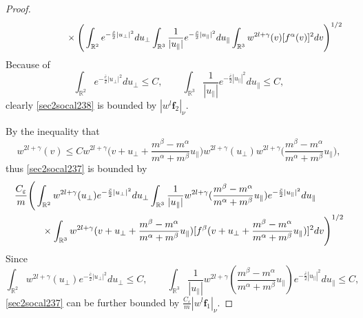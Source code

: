 \documentclass[reqno]{amsart}
\numberwithin{equation}{section}
\numberwithin{equation}{section}
\begin{document}
\begin{proof}
\begin{align}
			&\hspace{2.3cm}\times  \Bigg(\int_{\mathbb{R}^2}  
			e^{-\frac{\bar{c}}{2}|u_{\perp}|^2 } du_{\perp}
			\int_{\mathbb{R}^3}\frac{1}{|u_{\parallel}|}e^{-\frac{\bar{c}}{2}|u_{\parallel}|^2} du_{\parallel}\int_{\mathbb{R}^3}w^{2l+\gamma}(v)[f^\alpha(v)]^2dv\Bigg)^{1/2}\label{sec2socal238}
		\end{align}
		Because of
		\begin{equation*}
			\int_{\mathbb{R}^2}  
			e^{-\frac{\bar{c}}{2}|u_{\perp}|^2 } du_{\perp} \leq C, \qquad  \int_{\mathbb{R}^3}\frac{1}{|u_{\parallel}|}e^{-\frac{\bar{c}}{2}|u_{\parallel}|^2} du_{\parallel} \leq C,
		\end{equation*}
		clearly \eqref{sec2socal238} is  bounded by $|w^{l} \mathbf{f}_2|_\nu$. 
		
		By the inequality that
		\begin{equation*}
			w^{2l+\gamma}(v)\leq C w^{2l+\gamma}\big(v + u_{\perp}+\frac{m^{\beta}-m^{\alpha}}{m^{\alpha}+m^{\beta}}u_{\parallel}\big) w^{2l+\gamma}(u_{\perp}) w^{2l+\gamma}\big(\frac{m^{\beta}-m^{\alpha}}{m^{\alpha}+m^{\beta}}u_{\parallel}\big), 
		\end{equation*}
		thus \eqref{sec2socal237} is  bounded by
		\begin{align}
			&\frac{C_{\varepsilon}}{m} \Bigg(\int_{\mathbb{R}^2}  w^{2l+\gamma}(u_{\perp})
			e^{-\frac{\bar{c}}{2}|u_{\perp}|^2 } d u_{\perp}
			\int_{\mathbb{R}^3}\frac{1}{|u_{\parallel}|}w^{2l+\gamma}(\frac{m^{\beta}-m^{\alpha}}{m^{\alpha}+m^{\beta}}u_{\parallel})e^{-\frac{\bar{c}}{2}|u_{\parallel}|^2} du_{\parallel}\notag\\
			&\hspace{1cm}\times \int_{\mathbb{R}^3} w^{2l+\gamma}(v + u_{\perp}+\frac{m^{\beta}-m^{\alpha}}{m^{\alpha}+m^{\beta}}u_{\parallel})[f^\beta(v + u_{\perp}+\frac{m^{\beta}-m^{\alpha}}{m^{\alpha}+m^{\beta}}u_{\parallel})]^2dv\Bigg)^{1/2}\label{malneqmbetuprupeeq}
		\end{align}
		Since 
		\begin{equation*}
			\int_{\mathbb{R}^2}  w^{2l+\gamma}(u_{\perp})
			e^{-\frac{\bar{c}}{2}|u_{\perp}|^2 } du_{\perp} \leq C, \qquad  \int_{\mathbb{R}^3}\frac{1}{|u_{\parallel}|}w^{2l+\gamma}(\frac{m^{\beta}-m^{\alpha}}{m^{\alpha}+m^{\beta}}u_{\parallel})e^{-\frac{\bar{c}}{2}|u_{\parallel}|^2} du_{\parallel} \leq C,
		\end{equation*}
		\eqref{sec2socal237} can be further bounded by $\frac{C_{\varepsilon}}{m} |w^{l} \mathbf{f}_1|_\nu$.
		

\end{proof}
\end{document}
